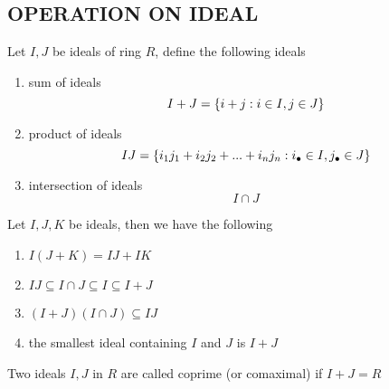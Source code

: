 \subsection{OPERATION ON IDEAL}

\begin{definition}
	Let $I, J$ be ideals of ring $R$, define the following ideals
	\begin{enumerate}
		\item sum of ideals
		$$
			I + J = \{i + j: i \in I, j \in J\}
		$$
		
		
		\item product of ideals
		$$
			IJ = \{i_1 j_1 + i_2 j_2 + ... + i_n j_n: i_\bullet \in I, j_\bullet \in J\}
		$$
		
		\item intersection of ideals
		$$
			I \cap J
		$$
	\end{enumerate}
\end{definition}

\begin{remark}
	Let $I, J, K$ be ideals, then we have the following
	\begin{enumerate}
		\item $I(J + K) = IJ + IK$
		
		\item $IJ \subseteq I \cap J \subseteq I \subseteq I + J$
		
		\item $(I + J)(I \cap J) \subseteq IJ$
		
		\item the smallest ideal containing $I$ and $J$ is $I + J$
	\end{enumerate}
\end{remark}

\begin{definition}[coprime]
	Two ideals $I, J$ in $R$ are called coprime (or comaximal) if $I + J = R$
\end{definition}

